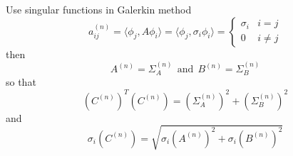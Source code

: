 \documentclass[
paper=A6,landscape,
fontsize=11pt, %
pagesize, %
parskip=half-, %
]{scrartcl} %
\theoremstyle{mythmstyle} %
\begin{document}
Use singular functions in Galerkin method
$$a_{ij}^{(n)}= \langle \phi_j, A \phi_i \rangle   =  \langle \phi_j, \sigma_i \phi_i \rangle  =   \left\{ \begin{array}{ll} \sigma_i & i=j \\ 0 & i \neq j \end{array} \right. $$
then $$A^{(n)}= \Sigma_A^{(n)} \ \  \mbox{and} \ \  B^{(n)}= \Sigma_B^{(n)}$$ so that
\[ \left( C^{(n)} \right)^T \left( C^{(n)} \right) = \left( \Sigma_A^{(n)}\right)^2 + \left( \Sigma_B^{(n)}\right)^2 \] and
\[\sigma_i \left( C^{(n)} \right) = \sqrt{\sigma_i \left( A^{(n)} \right)^2 + \sigma_i \left( B^{(n)} \right)^2}\]
\clearpage
%
%
%
%
%
%
%
%
%
\end{document}

